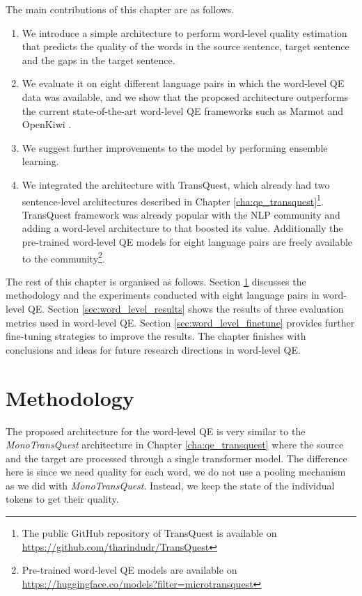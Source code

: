 The main contributions of this chapter are as follows.
\begin{enumerate}
  \item We introduce a simple architecture to perform word-level quality estimation that predicts the quality of the words in the source sentence, target sentence and the gaps in the target sentence.
  
  \item We evaluate it on eight different language pairs in which the word-level QE data was available, and we show that the proposed architecture outperforms the current state-of-the-art word-level QE frameworks such as Marmot \autocite{logacheva-etal-2016-marmot} and OpenKiwi \autocite{kepler-etal-2019-openkiwi}.
  
  \item We suggest further improvements to the model by performing ensemble learning.
  
  \item We integrated the architecture with TransQuest, which already had two sentence-level architectures described in Chapter \ref{cha:qe_transquest}\footnote{The public GitHub repository of TransQuest is available on \url{https://github.com/tharindudr/TransQuest}}. TransQuest framework was already popular with the NLP community and adding a word-level architecture to that boosted its value. Additionally the pre-trained word-level QE models for eight language pairs are freely available to the community\footnote{Pre-trained word-level QE models are available on \url{https://huggingface.co/models?filter=microtransquest}}. 
  	
\end{enumerate}

The rest of this chapter is organised as follows. Section \ref{sec:word_level_method} discusses the methodology and the experiments conducted with eight language pairs in word-level QE.  Section \ref{sec:word_level_results} shows the results of three evaluation metrics used in word-level QE. Section \ref{sec:word_level_finetune} provides further fine-tuning strategies to improve the results. The chapter finishes with conclusions and ideas for future research directions in word-level QE.

\section{Methodology}
\label{sec:word_level_method}
The proposed architecture for the word-level QE is very similar to the \textit{MonoTransQuest} architecture in Chapter \ref{cha:qe_transquest} where the source and the target are processed through a single transformer model. The difference here is since we need quality for each word, we do not use a pooling mechanism as we did with \textit{MonoTransQuest}. Instead, we keep the state of the individual tokens to get their quality.

